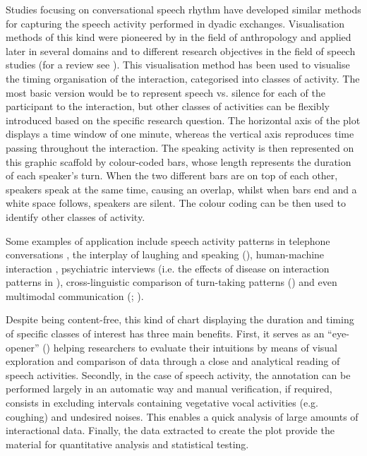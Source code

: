 Studies focusing on conversational speech rhythm have developed similar methods for capturing the speech activity performed in dyadic exchanges. Visualisation methods of this kind were pioneered by \citet{Chapple1939} in the field of anthropology and applied later in several domains and to different research objectives in the field of speech studies (for a review see \citealt{CangemiEtAl2023}). This visualisation method has been used to visualise the timing organisation of the interaction, categorised into classes of activity. The most basic version would be to represent speech vs. silence for each of the participant to the interaction, but other classes of activities can be flexibly introduced based on the specific research question. The horizontal axis of the plot displays a time window of one minute, whereas the vertical axis reproduces time passing throughout the interaction. The speaking activity is then represented on this graphic scaffold by colour-coded bars, whose length represents the duration of each speaker’s turn. When the two different bars are on top of each other, speakers speak at the same time, causing an overlap, whilst when bars end and a white space follows, speakers are silent. The colour coding can be then used to identify other classes of activity.

Some examples of application include speech activity patterns in telephone conversations \citep{Campbell2007}, the interplay of laughing and speaking (\citealt{TrouvainTruong2013}), human-machine interaction \citep{GilmartinEtAl2018}, psychiatric interviews (i.e. the effects of disease on interaction patterns in \citealt{CangemiEtAl2023}), cross-linguistic comparison of turn-taking patterns (\citealt{DingemanseLiesenfeld2022}) and even multimodal communication (\citealt{RühlemannPtak2023}; \citealt{SpaniolEtAl2023}). 

Despite being content-free, this kind of chart displaying the duration and timing of specific classes of interest has three main benefits. First, it serves as an “eye-opener” (\citealt[4]{TrouvainTruong2013}) helping researchers to evaluate their intuitions by means of visual exploration and comparison of data through a close and analytical reading of speech activities. Secondly, in the case of speech activity, the annotation can be performed largely in an automatic way and manual verification, if required, consists in excluding intervals containing vegetative vocal activities (e.g. coughing) and undesired noises. This enables a quick analysis of large amounts of interactional data. Finally, the data extracted to create the plot provide the material for quantitative analysis and statistical testing. 

